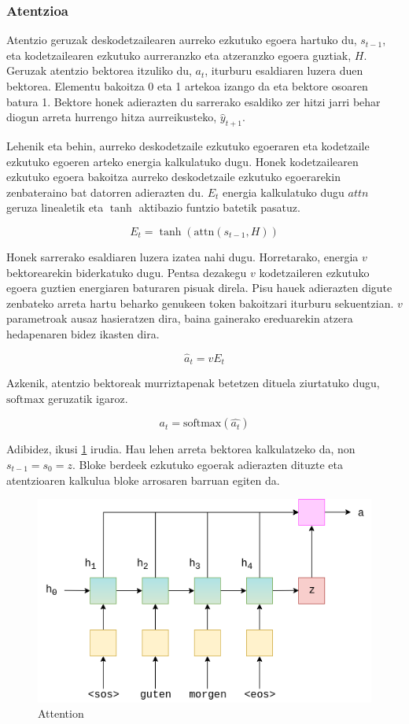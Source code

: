\documentclass[11pt,a4paper]{article}
\begin{document}
\subsubsection{Atentzioa}

Atentzio geruzak deskodetzailearen aurreko ezkutuko egoera hartuko du, $s_{t-1}$, eta kodetzailearen ezkutuko aurreranzko eta atzeranzko egoera guztiak, $H$. Geruzak atentzio bektorea itzuliko du, $a_t$, iturburu esaldiaren luzera duen bektorea. Elementu bakoitza 0 eta 1 artekoa izango da eta bektore osoaren batura 1. Bektore honek adierazten du sarrerako esaldiko zer hitzi jarri behar diogun arreta hurrengo hitza aurreikusteko, $\hat{y}_{t+1}$.

Lehenik eta behin, aurreko deskodetzaile ezkutuko egoeraren eta kodetzaile ezkutuko egoeren arteko energia kalkulatuko dugu. Honek kodetzailearen ezkutuko egoera bakoitza aurreko deskodetzaile ezkutuko egoerarekin zenbateraino bat datorren adierazten du. $E_t$ energia kalkulatuko dugu $attn$ geruza linealetik eta $\tanh$ aktibazio funtzio batetik pasatuz.

$$E_t = \tanh(\text{attn}(s_{t-1}, H))$$ 

Honek sarrerako esaldiaren luzera izatea nahi dugu. Horretarako, energia $v$ bektorearekin biderkatuko dugu. Pentsa dezakegu $v$ kodetzaileren ezkutuko egoera guztien energiaren baturaren pisuak direla. Pisu hauek adierazten digute zenbateko arreta hartu beharko genukeen token bakoitzari iturburu sekuentzian. $v$ parametroak ausaz hasieratzen dira, baina gainerako ereduarekin atzera hedapenaren bidez ikasten dira.

$$\hat{a}_t = v E_t$$

Azkenik, atentzio bektoreak murriztapenak betetzen dituela ziurtatuko dugu, $ \text{softmax}$ geruzatik igaroz.

$$a_t = \text{softmax}(\hat{a_t})$$

Adibidez, ikusi \ref{fig:attention} irudia. Hau lehen arreta bektorea kalkulatzeko da, non $s_{t-1} = s_0 = z$. Bloke berdeek ezkutuko egoerak adierazten dituzte eta atentzioaren kalkulua bloke arrosaren barruan egiten da.

\begin{figure}[ht]
    \centering
    \includegraphics[width=\linewidth]{attention}
    \caption{Attention}
    \label{fig:attention}
\end{figure}
\end{document}
